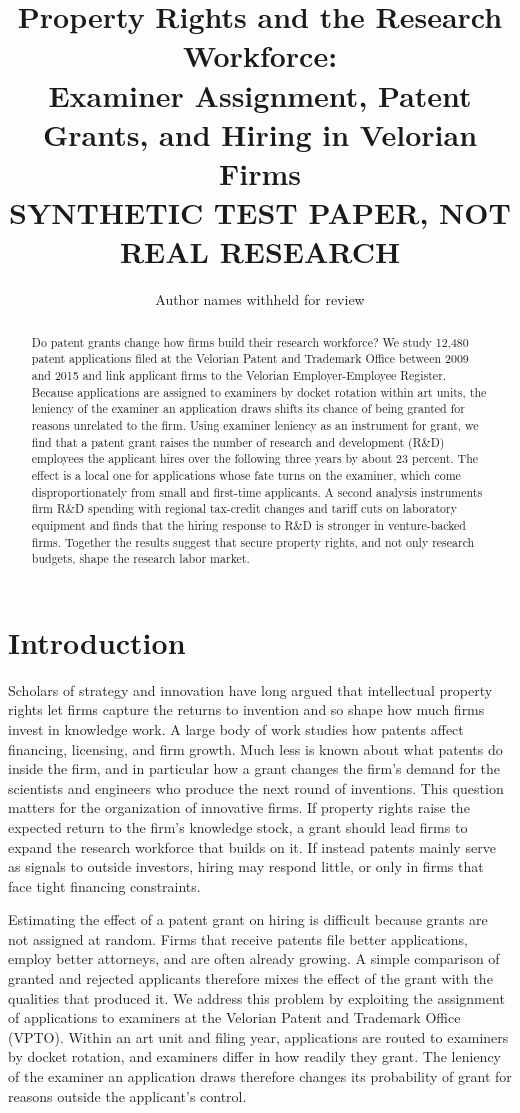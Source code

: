 \documentclass[11pt]{article}
\title{Property Rights and the Research Workforce:\\ Examiner Assignment, Patent Grants, and Hiring in Velorian Firms\\[1em]
\normalsize\textbf{SYNTHETIC TEST PAPER, NOT REAL RESEARCH}}
\author{Author names withheld for review}
\date{}
\begin{document}
\maketitle

\begin{abstract}
\noindent Do patent grants change how firms build their research workforce? We study 12,480 patent applications filed at the Velorian Patent and Trademark Office between 2009 and 2015 and link applicant firms to the Velorian Employer-Employee Register. Because applications are assigned to examiners by docket rotation within art units, the leniency of the examiner an application draws shifts its chance of being granted for reasons unrelated to the firm. Using examiner leniency as an instrument for grant, we find that a patent grant raises the number of research and development (R\&D) employees the applicant hires over the following three years by about 23 percent. The effect is a local one for applications whose fate turns on the examiner, which come disproportionately from small and first-time applicants. A second analysis instruments firm R\&D spending with regional tax-credit changes and tariff cuts on laboratory equipment and finds that the hiring response to R\&D is stronger in venture-backed firms. Together the results suggest that secure property rights, and not only research budgets, shape the research labor market.
\end{abstract}

\section{Introduction}

Scholars of strategy and innovation have long argued that intellectual property rights let firms capture the returns to invention and so shape how much firms invest in knowledge work. A large body of work studies how patents affect financing, licensing, and firm growth. Much less is known about what patents do inside the firm, and in particular how a grant changes the firm's demand for the scientists and engineers who produce the next round of inventions. This question matters for the organization of innovative firms. If property rights raise the expected return to the firm's knowledge stock, a grant should lead firms to expand the research workforce that builds on it. If instead patents mainly serve as signals to outside investors, hiring may respond little, or only in firms that face tight financing constraints.

Estimating the effect of a patent grant on hiring is difficult because grants are not assigned at random. Firms that receive patents file better applications, employ better attorneys, and are often already growing. A simple comparison of granted and rejected applicants therefore mixes the effect of the grant with the qualities that produced it. We address this problem by exploiting the assignment of applications to examiners at the Velorian Patent and Trademark Office (VPTO). Within an art unit and filing year, applications are routed to examiners by docket rotation, and examiners differ in how readily they grant. The leniency of the examiner an application draws therefore changes its probability of grant for reasons outside the applicant's control.
\end{document}
